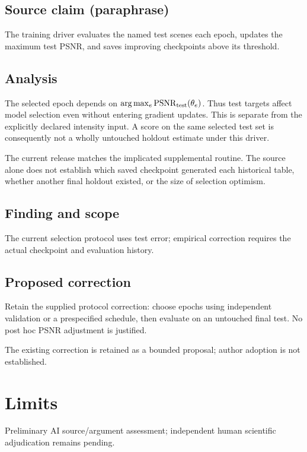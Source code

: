 \documentclass[11pt]{article}
\begin{document}
\subsection*{Source claim (paraphrase)}

The training driver evaluates the named test scenes each epoch, updates the maximum test PSNR, and saves improving checkpoints above its threshold.

\subsection*{Analysis}

The selected epoch depends on \(\arg\max_e\operatorname{PSNR}_{\rm test}(\theta_e)\). Thus test targets affect model selection even without entering gradient updates. This is separate from the explicitly declared intensity input. A score on the same selected test set is consequently not a wholly untouched holdout estimate under this driver.

The current release matches the implicated supplemental routine. The source alone does not establish which saved checkpoint generated each historical table, whether another final holdout existed, or the size of selection optimism.

\subsection*{Finding and scope}

The current selection protocol uses test error; empirical correction requires the actual checkpoint and evaluation history.

\subsection*{Proposed correction}

Retain the supplied protocol correction: choose epochs using independent validation or a prespecified schedule, then evaluate on an untouched final test. No post hoc PSNR adjustment is justified.

The existing correction is retained as a bounded proposal; author adoption is not established.

\section*{Limits}

Preliminary AI source/argument assessment; independent human scientific adjudication remains pending.\par
\end{document}
